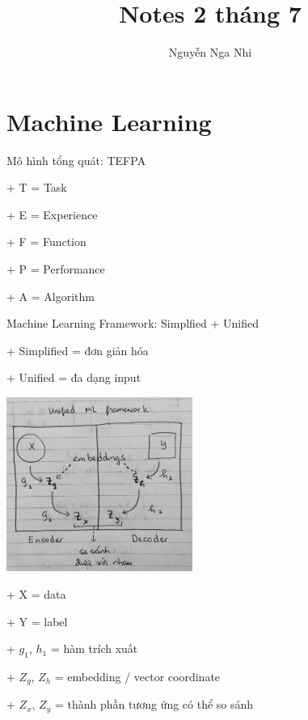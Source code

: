 \documentclass{article}
\title{Notes 2 tháng 7}
\author{Nguyễn Nga Nhi}
\begin{document}
\maketitle

\section{Machine Learning}

Mô hình tổng quát: TEFPA

+ T = Task

+ E = Experience

+ F = Function

+ P = Performance

+ A = Algorithm

Machine Learning Framework: Simplfied + Unified

+ Simplified = đơn giản hóa

+ Unified = đa dạng input

\includegraphics[width=230]{Unified ML Framework.jpg}

+ X = data

+ Y = label

+ $g_1$, $h_1$ = hàm trích xuất

+ $Z_g$, $Z_h$ = embedding / vector coordinate

+ $Z_x$, $Z_y$ = thành phần tương ứng có thể so sánh
\end{document}

